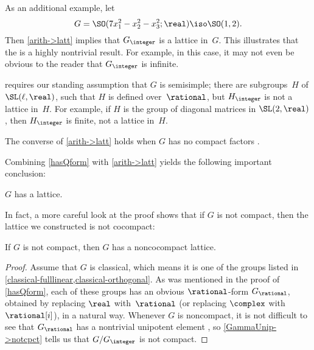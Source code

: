 \begin{eg}
 As an additional example, let 
 	$$G = \SO(7 x_1^2 - x_2^2 - x_3^2; \real) \iso \SO(1,2). $$
Then \cref{arith->latt}
implies that $G_{\integer}$ is a lattice in~$G$. This
illustrates that the  is a highly nontrivial result.
For example, in this case, it may not even be obvious to the
reader that $G_{\integer}$ is infinite. 
 \end{eg}

\begin{warn}
  requires our standing assumption
that $G$ is semisimple; there are subgroups~$H$ of
$\SL(\ell,\real)$, such that $H$ is defined
over~$\rational$, but $H_{\integer}$ is not a lattice in~$H$.
For example, if $H$ is the group of diagonal matrices in
$\SL(2,\real)$, then $H_{\integer}$ is finite, not a lattice in~$H$.
 \end{warn}

 \begin{rem} The converse of \cref{arith->latt} holds
when $G$ has no compact factors .
 \end{rem}

Combining \cref{hasQform} with \cref{arith->latt}
yields the following important conclusion:

\begin{cor} \label{GHasLatt}
 $G$ has a lattice.
 \end{cor}

 In fact, a more careful look at the proof shows that if $G$ is not compact, then the lattice we constructed is not cocompact:

\begin{cor} \label{GHasNoncpctLatt}
If $G$ is not compact, then $G$ has a noncocompact lattice.
\end{cor}

\begin{proof}
Assume that $G$ is classical, which means it is one of the groups listed in \cref{classical-fulllinear,classical-orthogonal}. As was mentioned in the proof of \cref{hasQform}, each of these groups has an obvious $\rational$-form $G_\rational$, obtained by replacing $\real$ with~$\rational$ (or replacing $\complex$ with $\rational[i]$), in a natural way.
Whenever $G$ is noncompact, it is not difficult to see that $G_\rational$ has a nontrivial unipotent element , so \cref{GammaUnip->notcpct} tells us that $G/G_\integer$ is not compact. 
\end{proof}

